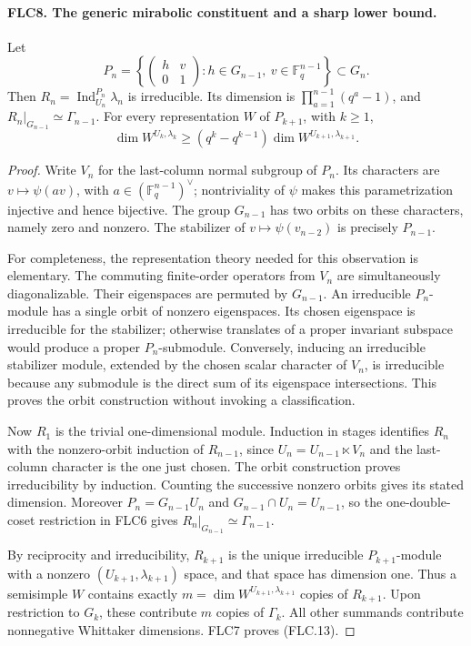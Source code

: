 \documentclass[11pt,a4paper]{article}
\numberwithin{equation}{section}
\theoremstyle{remark}\newtheorem{remark}[theorem]{Remark}
\begin{document}
\paragraph{FLC8. The generic mirabolic constituent and a sharp lower bound.}
\label{claim:FLC8}
Let
\[
 P_n=\left\{\begin{pmatrix}h&v\\0&1\end{pmatrix}:
              h\in G_{n-1},\ v\in\mathbb F_q^{n-1}\right\}
               \subset G_n.
\]
Then $R_n=\operatorname{Ind}_{U_n}^{P_n}\lambda_n$ is
irreducible.  Its dimension is
$\prod_{a=1}^{n-1}(q^a-1)$, and
$R_n|_{G_{n-1}}\simeq\Gamma_{n-1}$.
For every representation $W$ of $P_{k+1}$, with $k\ge1$,
\[
 \dim W^{U_k,\lambda_k}\ge
          (q^k-q^{k-1})\dim W^{U_{k+1},\lambda_{k+1}}.
 \tag{FLC.13}
\]
\begin{proof}
Write $V_n$ for the last-column normal subgroup of $P_n$.
Its characters are $v\mapsto\psi(av)$, with
$a\in(\mathbb F_q^{n-1})^\vee$; nontriviality of $\psi$
makes this parametrization injective and hence bijective.
The group $G_{n-1}$ has two orbits on these characters,
namely zero and nonzero.  The stabilizer of
$v\mapsto\psi(v_{n-2})$ is precisely $P_{n-1}$.

For completeness, the representation theory needed for this
observation is elementary.  The commuting finite-order
operators from $V_n$ are simultaneously diagonalizable.
Their eigenspaces are permuted by $G_{n-1}$.  An irreducible
$P_n$-module has a single orbit of nonzero eigenspaces.
Its chosen eigenspace is irreducible for the stabilizer;
otherwise translates of a proper invariant subspace would
produce a proper $P_n$-submodule.  Conversely, inducing an
irreducible stabilizer module, extended by the chosen scalar
character of $V_n$, is irreducible because any submodule is
the direct sum of its eigenspace intersections.  This proves
the orbit construction without invoking a classification.

Now $R_1$ is the trivial one-dimensional module.  Induction
in stages identifies $R_n$ with the nonzero-orbit induction
of $R_{n-1}$, since
$U_n=U_{n-1}\ltimes V_n$ and the last-column character is the
one just chosen.  The orbit construction proves irreducibility
by induction.  Counting the successive nonzero orbits gives
its stated dimension.  Moreover $P_n=G_{n-1}U_n$ and
$G_{n-1}\cap U_n=U_{n-1}$, so the one-double-coset restriction
in FLC6 gives $R_n|_{G_{n-1}}\simeq\Gamma_{n-1}$.

By reciprocity and irreducibility, $R_{k+1}$ is the unique
irreducible $P_{k+1}$-module with a nonzero
$(U_{k+1},\lambda_{k+1})$ space, and that space has dimension
one.  Thus a semisimple $W$ contains exactly
$m=\dim W^{U_{k+1},\lambda_{k+1}}$ copies of $R_{k+1}$.
Upon restriction to $G_k$, these contribute $m$ copies of
$\Gamma_k$.  All other summands contribute nonnegative
Whittaker dimensions.  FLC7 proves (FLC.13).
\end{proof}
\end{document}
